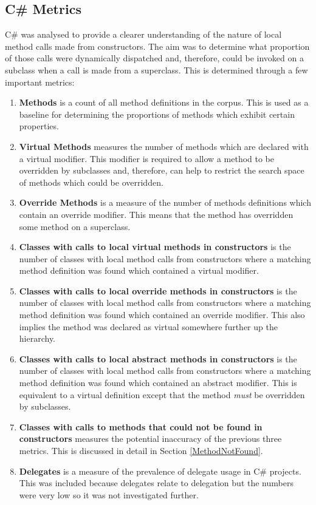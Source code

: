 \subsection{C\# Metrics}
C\# was analysed to provide a clearer understanding of the nature of local method calls made from constructors. The aim was to determine what proportion of those calls were dynamically dispatched and, therefore, could be invoked on a subclass when a call is made from a superclass. This is determined through a few important metrics:
\begin{enumerate}
	\item \textbf{Methods} is a count of all method definitions in the corpus. This is used as a baseline for determining the proportions of methods which exhibit certain properties.
	
	\item \textbf{Virtual Methods} measures the number of methods which are declared with a virtual modifier. This modifier is required to allow a method to be overridden by subclasses and, therefore, can help to restrict the search space of methods which could be overridden.
	
	\item \textbf{Override Methods} is a measure of the number of methods definitions which contain an override modifier. This means that the method has overridden some method on a superclass.
	
	\item \textbf{Classes with calls to local virtual methods in constructors} is the number of classes with local method calls from constructors where a matching method definition was found which contained a virtual modifier.
	
	\item \textbf{Classes with calls to local override methods in constructors} is the number of classes with local method calls from constructors where a matching method definition was found which contained an override modifier. This also implies the method was declared as virtual somewhere further up the hierarchy.
	
	\item \textbf{Classes with calls to local abstract methods in constructors}  is the number of classes with local method calls from constructors where a matching method definition was found which contained an abstract modifier. This is equivalent to a virtual definition except that the method \textit{must} be overridden by subclasses.
	
	\item \textbf{Classes with calls to methods that could not be found in constructors} measures the potential inaccuracy of the previous three metrics. This is discussed in detail in Section \ref{MethodNotFound}.
		
	\item \textbf{Delegates} is a measure of the prevalence of delegate usage in C\# projects. This was included because delegates relate to delegation but the numbers were very low so it was not investigated further.
\end{enumerate}

